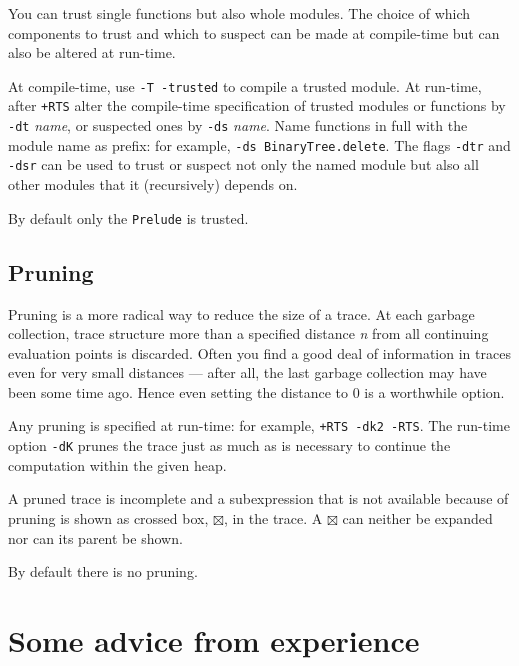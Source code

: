 \documentclass[12pt]{article}
\newcommand{\crossBox}{\boxtimes}
\begin{document}
You can trust single functions but also whole modules.
The choice of which components to trust and which to suspect can be made at
compile-time but can also be altered at run-time.
   
At compile-time, use \texttt{-T -trusted} to compile a trusted module. 
At run-time, after \texttt{+RTS} alter the compile-time specification
of trusted modules or functions by \texttt{-dt} \emph{name}, or suspected
ones by \texttt{-ds} \emph{name}.  Name functions in full with the
module name as prefix: for example, \texttt{-ds BinaryTree.delete}.
The flags \texttt{-dtr} and \texttt{-dsr} can be used to trust or suspect not only the
named module but also all other modules that it (recursively) depends on.
 
By default only the \texttt{Prelude} is trusted.


\subsection{Pruning}

Pruning is a more radical way to reduce the size of a trace.
At each garbage collection, trace structure more
than a specified distance \emph{n} from all continuing evaluation points
is discarded. Often you find a good deal of information in traces even for very small distances --- after all, the last garbage collection may have been some time ago. Hence even setting the distance to 0 is a worthwhile option.
 
Any pruning is specified at run-time: for example,
\texttt{+RTS -dk2 -RTS}.
The run-time option \texttt{-dK} prunes the trace just as much as is necessary to continue the computation within the given heap.

A pruned trace is incomplete and a subexpression that is not available because of pruning is shown as crossed box, $\crossBox$, in the trace.
A $\crossBox$ can neither be expanded nor can its parent be shown.
   
By default there is no pruning.




\section{Some advice from experience}
\end{document}
